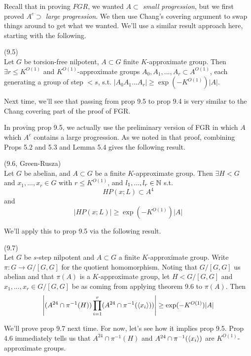 \documentclass[a4paper]{article}
\begin{document}
Recall that in proving $FGR$, we wanted \emph{$A \subset$ small progression}, but we first proved \emph{$A^c \supset$ large progression}. We then use Chang's covering argument to swap things around to get what we wanted. We'll use a similar result approach here, starting with the following.

\begin{prop} (9.5)\\
Let $G$ be torsion-free nilpotent, $A \subset G$ finite $K$-approximate group. Then $\exists r \leq K^{O(1)}$ and $K^{O(1)}$-approximate groups $A_0,A_1,...,A_r \subset A^{O(1)}$, each generating a group of step $<s$, s.t. $|A_0A_1...A_r| \geq \exp(-K^{O(1)})|A|$.
\end{prop}

Next time, we'll see that passing from prop 9.5 to prop 9.4 is very similar to the Chang covering part of the proof of FGR.

In proving prop 9.5, we actually use the preliminary version of FGR in which $A$ which $A^c$ contains a large progression. As we noted in that proof, combining Props 5.2 and 5.3 and Lemma 5.4 gives the following result.

\begin{thm} (9.6, Green-Rusza)\\
Let $G$ be abelian, and $A \subset G$ be a finite $K$-approximate group. Then $\exists H < G$ and $x_1,...,x_r \in G$ with $r \leq K^{O(1)}$, and $l_1,...,l_r \in \mathbb{N}$ s.t.
\[
HP(x;L) \subset A^4
\]
and
\[
|HP(x;L)| \geq \exp(-K^{O(1)})|A|
\]
\end{thm}

We'll apply this to prop 9.5 via the following result.

\begin{prop} (9.7)\\
Let $G$ be $s$-step nilpotent and $A \subset G$ a finite $K$-approximate group. Write $\pi:G \to G/[G,G]$ for the quotient homomorphism. Noting that $G/[G,G]$ us abelian and that $\pi(A)$ is a $K$-approximate group, let $H < G/[G,G]$ and $x_1,...,x_r \in G/[G,G]$ be as coming from applying theorem 9.6 to $\pi(A)$. Then
\[
\left|(A^{24} \cap \pi^{-1}(H)) \prod_{i =1}^r(A^{24} \cap \pi^{-1}(\langle x_i\rangle))\right| \geq \exp(-K^{O(1)})|A|
\]
\end{prop}

We'll prove prop 9.7 next time. For now, let's see how it implies prop 9.5. Prop 4.6 immediately tells us that $A^{24} \cap \pi^{-1}(H)$ and $A^{24} \cap \pi^{-1}(\langle x_i\rangle)$ are $K^{O(1)}$-approximate groups.
\end{document}
